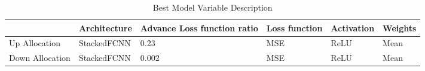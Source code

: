 \begin{table}[H] 
    \caption{Best Model Variable Description \label{chosen_models}}
    \begin{tabularx}{\textwidth}{CCCCCC}
    \toprule
    & \textbf{Architecture}	& \textbf{Advance Loss function ratio} & \textbf{Loss function} & \textbf{Activation} & \textbf{Weights}\\
    \midrule
    Up Allocation & StackedFCNN & 0.23 & MSE & ReLU & Mean \\
    Down Allocation & StackedFCNN & 0.002 & MSE & ReLU & Mean \\
        \bottomrule
    \end{tabularx}
\end{table}
